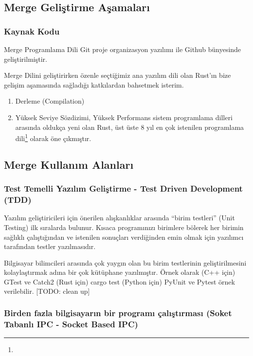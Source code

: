 \documentclass[11pt]{article}
\begin{document}
\subsection{Merge Geliştirme Aşamaları}
\label{sec:org7302641}

\subsubsection{Kaynak Kodu}
\label{sec:org4815a23}

Merge Programlama Dili Git proje organizasyon yazılımı ile Github bünyesinde geliştirilmiştir.

Merge Dilini geliştirirken özenle seçtiğimiz ana yazılım dili olan Rust'ın bize gelişim aşamasında sağladığı katkılardan bahsetmek isterim.
\begin{enumerate}
\item Derleme (Compilation)
\label{sec:org7a1577f}
\item Yüksek Seviye Sözdizimi, Yüksek Performans
\label{sec:orgff53a54}
sistem programlama dilleri arasında oldukça yeni olan Rust, üst üste 8 yıl en çok istenilen programlama dili\footnote{} olarak öne çıkmıştır.
\end{enumerate}
\subsection{Merge Kullanım Alanları}
\label{sec:org78806eb}

\subsubsection{Test Temelli Yazılım Geliştirme - Test Driven Development (TDD)}
\label{sec:org56bb7b5}

Yazılım geliştiricileri için önerilen alışkanlıklar arasında ``birim testleri'' (Unit Testing) ilk sıralarda bulunur.
Kısaca programınızı birimlere bölerek her birimin sağlıklı çalıştığından ve istenilen sonuçları verdiğinden emin olmak için yazılımcı tarafından testler yazılmasıdır.

Bilgisayar bilimcileri arasında çok yaygın olan bu birim testlerinin geliştirilmesini kolaylaştırmak adına bir çok kütüphane yazılmıştır.
Örnek olarak (C++ için) GTest ve Catch2 (Rust için) cargo test (Python için) PyUnit ve Pytest örnek verilebilir. [TODO: clean up]
\subsubsection{Birden fazla bilgisayarın bir programı çalıştırması (Soket Tabanlı IPC - Socket Based IPC)}
\label{sec:org0e83001}
\end{document}

